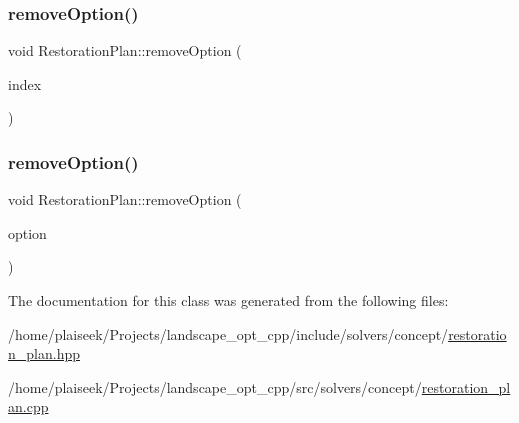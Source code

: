 \mbox{\label{class_restoration_plan_a69958ecdd37533b64b601f6c2f190875}} 
\subsubsection{\texorpdfstring{remove\+Option()}{removeOption()}\hspace{0.1cm}{\footnotesize\ttfamily [1/2]}}
{\footnotesize\ttfamily void Restoration\+Plan\+::remove\+Option (\begin{DoxyParamCaption}\item[{int}]{index }\end{DoxyParamCaption})}

\mbox{\label{class_restoration_plan_a7ea1f7c7dcee6357b0bd3a2d868a13b9}} 
\subsubsection{\texorpdfstring{remove\+Option()}{removeOption()}\hspace{0.1cm}{\footnotesize\ttfamily [2/2]}}
{\footnotesize\ttfamily void Restoration\+Plan\+::remove\+Option (\begin{DoxyParamCaption}\item[{\hyperlink{class_restoration_plan_1_1_option}{Restoration\+Plan\+::\+Option} $\ast$}]{option }\end{DoxyParamCaption})}



The documentation for this class was generated from the following files\+:\begin{DoxyCompactItemize}
\item 
/home/plaiseek/\+Projects/landscape\+\_\+opt\+\_\+cpp/include/solvers/concept/\hyperlink{restoration__plan_8hpp}{restoration\+\_\+plan.\+hpp}\item 
/home/plaiseek/\+Projects/landscape\+\_\+opt\+\_\+cpp/src/solvers/concept/\hyperlink{restoration__plan_8cpp}{restoration\+\_\+plan.\+cpp}\end{DoxyCompactItemize}
